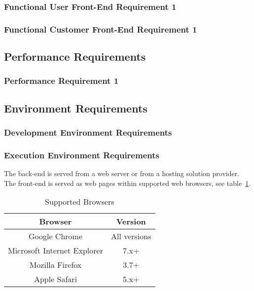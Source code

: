 \documentclass{article}
\begin{document}
\subsubsection{Functional User Front-End Requirement 1}
\label{func-user-front-end-1}


\subsubsection{Functional Customer Front-End Requirement 1}
\label{func-cust-front-end-1}


\subsection{Performance Requirements}
\subsubsection{Performance Requirement 1}
\subsection{Environment Requirements}
\subsubsection{Development Environment Requirements}
\subsubsection{Execution Environment Requirements}

The back-end is served from a web server or from a hosting solution provider.  The
front-end is served as web pages within supported web browsers, see table~\ref{browsers}.

\begin{table}
\centering
\begin{tabular}{|c|c|}\hline
Browser & Version \\\hline
Google Chrome & All versions  \\\hline
Microsoft Internet Explorer & 7.x+ \\\hline
Mozilla Firefox & 3.7+ \\\hline
Apple Safari & 5.x+ \\\hline
\end{tabular}
\caption{Supported Browsers}
\label{browsers}
\end{table}
\end{document}
